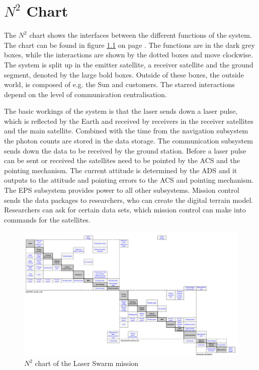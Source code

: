 \chapter{$N^2$ Chart}
\label{sec:n2chart}
The $N^2$ chart shows the interfaces between the different functions of the system. The chart can be found in figure \ref{fig:n2chart} on page \pageref{fig:n2chart}. The functions are in the dark grey boxes, while the interactions are shown by the dotted boxes and move clockwise. The system is split up in the emitter satellite, a receiver satellite and the ground segment, denoted by the large bold boxes. Outside of these boxes, the outside world, is composed of e.g. the Sun and customers. The starred interactions depend on the level of communication centralisation.

The basic workings of the system is that the laser sends down a laser pulse, which is reflected by the Earth and received by receivers in the receiver satellites and the main satellite. Combined with the time from the navigation subsystem the photon counts are stored in the data storage. The communication subsystem sends down the data to be received by the ground station. Before a laser pulse can be sent or received the satellites need to be pointed by the \acl{ACS} and the pointing mechanism. The current attitude is determined by the \ac{ADS} and it outputs to the attitude and pointing errors to the \ac{ACS} and pointing mechanism. The \ac{EPS} subsystem provides power to all other subsystems. Mission control sends the data packages to researchers, who can create the digital terrain model. Researchers can ask for certain data sets, which mission control can make into commands for the satellites.

\begin{figure}
\centering
\includegraphics[angle=90, height=\textheight]{chapters/img/N2chart_wo.png} 
\caption{$N^2$ chart of the Laser Swarm mission}
\label{fig:n2chart}
\end{figure}